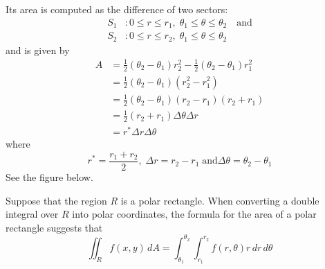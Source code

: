 \documentclass[handout]{ximera}
\begin{document}
Its area is computed as the difference of two sectors: 
\begin{align*}
S_1&: 0 \leq r\leq r_1, \; \theta_1 \leq \theta \leq \theta_2 \quad\text{and} \\
S_2&: 0 \leq r\leq r_2, \; \theta_1 \leq \theta \leq \theta_2
\end{align*}
and is given by
\begin{align*}
A &= \frac12 (\theta_2 - \theta_1) r_2^2 - \frac12 (\theta_2 -\theta_1) r_1^2\\
  &= \frac12 (\theta_2 - \theta_1) (r_2^2 - r_1^2)\\
  &= \frac12 (\theta_2 - \theta_1) (r_2 - r_1)(r_2 + r_1)\\
  &= \frac12(r_2 + r_1) \Delta \theta \Delta r \\
  &= r^* \Delta r \Delta \theta
\end{align*}
where
\[
r^* = \frac{r_1 + r_2}{2}, \; \Delta r = r_2 - r_1 \; \text{and} \Delta \theta = \theta_2 - \theta_1
\]
See the figure below.

\begin{image}
\end{image}


Suppose that the region $R$ is a polar rectangle. 
When converting a double integral over $R$ into polar coordinates, the formula for the area of a polar rectangle suggests that
\[
\iint_R f(x,y) \, dA = \int_{\theta_1}^{\theta_2} \int_{r_1}^{r_2} f(r, \theta) r \, dr\, d\theta
\]
\end{document}
